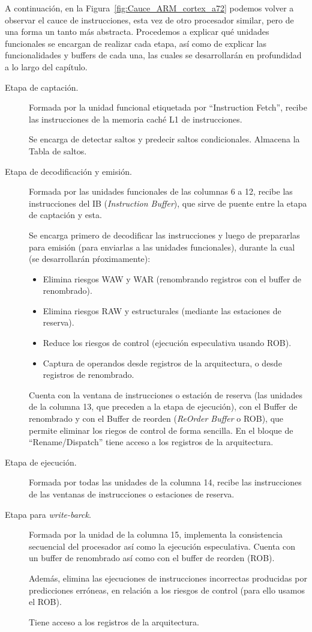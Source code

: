 A continuación, en la Figura~\ref{fig:Cauce_ARM_cortex_a72} podemos volver a observar el cauce de instrucciones, esta vez de otro procesador similar, pero de una forma un tanto más abstracta. Procedemos a explicar qué unidades funcionales se encargan de realizar cada etapa, así como de explicar las funcionalidades y buffers de cada una, las cuales se desarrollarán en profundidad a lo largo del capítulo.

\begin{description}
    \item [Etapa de captación.] Formada por la unidad funcional etiquetada por ``Instruction Fetch'', recibe las instrucciones de la memoria caché L1 de instrucciones.

        Se encarga de detectar saltos y predecir saltos condicionales. Almacena la Tabla de saltos.
    \item [Etapa de decodificación y emisión.] Formada por las unidades funcionales de las columnas 6 a 12, recibe las instrucciones del IB (\emph{Instruction Buffer}), que sirve de puente entre la etapa de captación y esta.

        Se encarga primero de decodificar las instrucciones y luego de prepararlas para emisión (para enviarlas a las unidades funcionales), durante la cual (se desarrollarán pŕoximamente):
        \begin{itemize}
            \item Elimina riesgos WAW y WAR (renombrando registros con el buffer de renombrado).
            \item Elimina riesgos RAW y estructurales (mediante las estaciones de reserva).
            \item Reduce los riesgos de control (ejecución especulativa usando ROB).
            \item Captura de operandos desde registros de la arquitectura, o desde registros de renombrado.
        \end{itemize}
        Cuenta con la ventana de instrucciones o estación de reserva (las unidades de la columna 13, que preceden a la etapa de ejecución), con el Buffer de renombrado y con el Buffer de reorden (\emph{ReOrder Buffer} o ROB), que permite eliminar los riegos de control de forma sencilla. En el bloque de ``Rename/Dispatch'' tiene acceso a los registros de la arquitectura.
    \item [Etapa de ejecución.] Formada por todas las unidades de la columna 14, recibe las instrucciones de las ventanas de instrucciones o estaciones de reserva.
    \item [Etapa para \emph{write-barck}.] Formada por la unidad de la columna 15, implementa la consistencia secuencial del procesador así como la ejecución especulativa. Cuenta con un buffer de renombrado así como con el buffer de reorden (ROB).

        Además, elimina las ejecuciones de instrucciones incorrectas producidas por predicciones erróneas, en relación a los riesgos de control (para ello usamos el ROB).

        Tiene acceso a los registros de la arquitectura.
\end{description}

